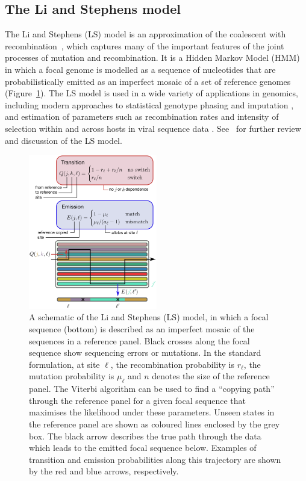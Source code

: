 \documentclass{article}
\begin{document}
\subsection{The Li and Stephens model}
\label{sec:ls}
The Li and Stephens (LS) model \citep{Li2003-ib} is an approximation of the
coalescent with recombination~\citep{Hudson1983-properties}, which captures
many of the important features of the joint processes of mutation and
recombination. It is a Hidden Markov Model (HMM) in which a focal genome
is modelled as a
sequence of nucleotides that are probabilistically emitted as
an imperfect mosaic of a set of reference genomes
(Figure~\ref{fig:ls_diagram}).
The LS model is used in a wide variety
of applications in genomics, including modern approaches to
statistical genotype phasing and imputation
\citep{Delaneau2019-wl,Browning2021-cg,Browning2018-nk,Rubinacci2020-pa},
and estimation of parameters such as
recombination rates \citep[e.g.,][]{Hinch2011-tz}
and intensity of selection within and across hosts in viral
sequence data \citep[e.g.,][]{Palmer2019-wa}.
See~\cite{Mcvean2019-linkage} for further review and discussion
of the LS model.

\begin{figure} \centering
\includegraphics[width=0.5\textwidth]{figures/ls_diagram_covid.pdf}
\caption{\label{fig:ls_diagram} A schematic of the Li and Stephens (LS)
model, in which a focal sequence (bottom) is described as an
imperfect mosaic of the sequences in a reference panel.
Black crosses along the focal sequence show sequencing
errors or mutations.
In the standard formulation, at site $\ell$, the recombination probability is $r_\ell$,
the mutation probability is $\mu_\ell$ and $n$
denotes the size of the reference panel.
The Viterbi algorithm can be used to find a
``copying path'' through the reference panel for a given focal sequence that
maximises the likelihood under these parameters. Unseen states in the reference panel are shown as coloured lines enclosed by
the grey box. The black arrow describes the true path through the data which leads to the emitted
focal sequence below. Examples of transition and
emission probabilities along this trajectory are shown by the red and blue
arrows, respectively.
}
\end{figure}
\end{document}
